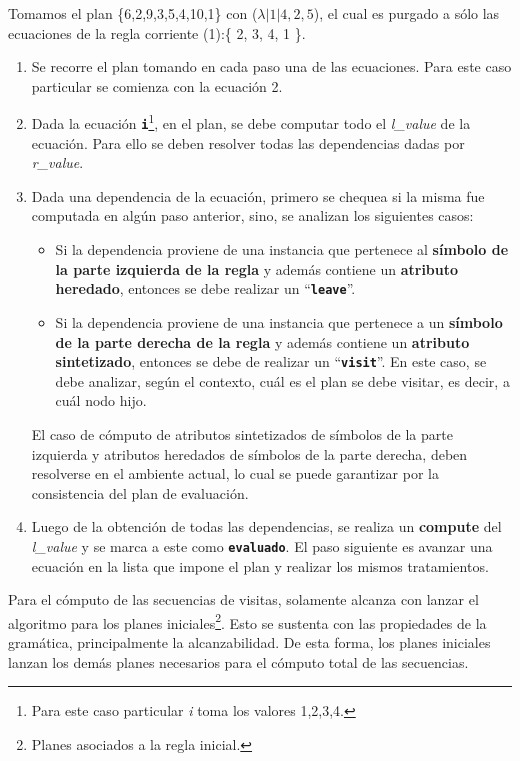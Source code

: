 \documentclass[runningheads,a4paper]{llncs}
\newcommand{\textbtt}[1]{\texttt{\textbf{#1}}}
\begin{document}
Tomamos el plan \{6,2,9,3,5,4,10,1\} con ($\lambda| 1 | 4,2,5$), el cual es purgado a sólo las ecuaciones de la regla corriente (1):\{ 2, 3, 4, 1 \}.

\begin{enumerate}
\item Se recorre el plan tomando en cada paso una de las ecuaciones. Para este caso particular se comienza con la ecuación 2.

\item Dada la ecuación \textbtt{i}\footnote{Para este caso particular \textit{i} toma los valores 1,2,3,4.}, en el plan, se debe computar todo el \textit{l\_value} de la ecuación. Para ello se deben resolver todas las dependencias dadas por \textit{r\_value}.

\item Dada una dependencia de la ecuación, primero se chequea si la misma fue computada en algún paso anterior, sino, se analizan los siguientes casos:

\begin{itemize}
\item Si la dependencia proviene de una instancia que pertenece al \textbf{símbolo de la parte izquierda de la regla} y además contiene un \textbf{atributo heredado}, entonces se debe realizar un ``\textbtt{leave}''.

\item Si la dependencia proviene de una instancia que pertenece a un \textbf{símbolo de la parte derecha de la regla} y además contiene un \textbf{atributo sintetizado}, entonces se debe de realizar un ``\textbtt{visit}''. En este caso, se debe analizar, según el contexto, cuál es el plan se debe visitar, es decir, a cuál nodo hijo. 
\end{itemize}

El caso de cómputo de atributos sintetizados de símbolos de la parte izquierda y atributos heredados de símbolos de la parte derecha, deben resolverse en el ambiente actual, lo cual se puede garantizar por la consistencia del plan de evaluación.

\item Luego de la obtención de todas las dependencias, se realiza un \textbf{compute} del \textit{l\_value} y se marca a este como \textbtt{evaluado}. El paso siguiente es avanzar una ecuación en la lista que impone el plan y realizar los mismos tratamientos.
\end{enumerate}

Para el cómputo de las secuencias de visitas, solamente alcanza con lanzar el algoritmo para los planes iniciales\footnote{Planes asociados a la regla inicial.}. Esto se sustenta con las propiedades de la gramática, principalmente la alcanzabilidad. De esta forma, los planes iniciales lanzan los demás planes necesarios para el cómputo total de las secuencias.
\end{document}
